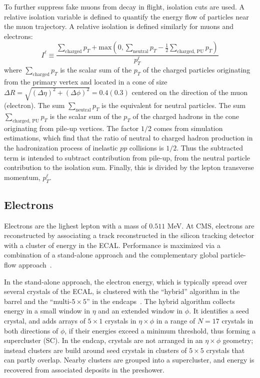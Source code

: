 To further suppress fake muons from decay in flight, isolation cuts are used. A relative isolation variable is defined to quantify the energy flow of particles near the muon trajectory.
A relative isolation is defined similarly for muons and electrons:
\begin{equation}
    I^\ell \equiv \frac{\sum_{\text{charged}} p_{T} + \text{max}\left( 0, \sum_{\text{neutral}} p_{T} - \frac{1}{2}  \sum_{\text{charged, PU}} p_{T}  \right)}{p_{T}^\ell}
    \label{eqn:definition-relative-isolation}
\end{equation}
where $\sum_{\text{charged}} p_{T}$ is the scalar sum of the $p_{T}$ of the charged particles originating from the primary vertex and located in a cone of size $\Delta R = \sqrt{(\Delta \eta)^2 + (\Delta \phi)^2} = 0.4 (0.3)$ centered on the direction of the muon (electron). The sum $\sum_{\text{neutral}} p_{T}$ is the equivalent for neutral particles. The sum $\sum_{\text{charged, PU}} p_{T}$ is the scalar sum of the $p_{T}$ of the charged hadrons in the cone originating from pile-up vertices. The factor $1/2$ comes from simulation estimations, which find that the ratio of neutral to charged hadron production in the hadronization process of inelastic $pp$ collisions is $1/2$. Thus the subtracted term is intended to subtract contribution from pile-up, from the neutral particle contribution to the isolation sum. Finally, this is divided by the lepton transverse momentum, $p_{T}^\ell$. 


\subsection{Electrons}
Electrons are the lighest lepton with a mass of $0.511$ MeV. At CMS, electrons are reconstructed by associating a track reconstructed in the silicon tracking detector with a cluster of energy in the ECAL. Performance is maximized via a combination of a stand-alone approach and the complementary global particle-flow approach~\citep{JINST-2015-10-P06005}. 

In the stand-alone approach, the electron energy, which is typically spread over several crystals of the ECAL, is clustered with the ``hybrid'' algorithm in the barrel and the ``multi-$5\times 5$'' in the endcaps~\citep{JINST-2015-10-P06005}. The hybrid algorithm collects energy in a small window in $\eta$ and an extended window in $\phi$. It identifies a seed crystal, and adds arrays of $5 \times 1$ crystals in $\eta \times \phi$ in a range of $N = 17$ crystals in both directions of $\phi$, if their energies exceed a minimum threshold, thus forming a supercluster (SC).  In the endcap, crystals are not arranged in an $\eta \times \phi$ geometry; instead clusters are build around seed crystals in clusters of $5\times 5$ crystals that can partly overlap. Nearby clusters are grouped into a supercluster, and energy is recovered from associated deposits in the preshower. 


